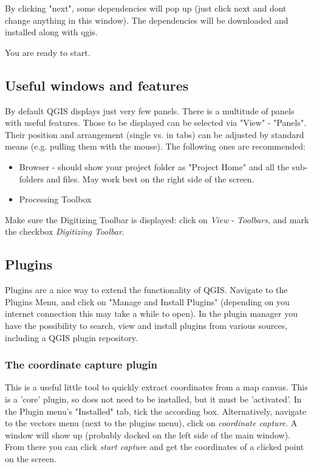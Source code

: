 \documentclass[12pt,a4paper]{scrartcl}
\begin{document}
By clicking "next", some dependencies will pop up (just click next and dont change anything in this window).
The dependencies will be downloaded and installed along with qgis.\newline

You are ready to start.

\subsection{Useful windows and features}
\label{subsec:qgis_adjust}
By default QGIS displays just very few panels. There is a multitude of panels with useful features. Those to be displayed can be selected via "View" - "Panels". Their position and arrangement (single vs. in tabs) can be adjusted by standard means (e.g. pulling them with the mouse). The following ones are recommended:
\begin{itemize}
	\item Browser - should show your project folder as "Project Home"  and all the sub-folders and files. May work best on the right side of the screen.
	\item Processing Toolbox
\end{itemize}

Make sure the Digitizing Toolbar is displayed: click on \textit{View} - \textit{Toolbars}, and mark the checkbox \textit{Digitizing Toolbar}.

\subsection{Plugins}
Plugins are a nice way to extend the functionality of QGIS. Navigate to the Plugins Menu, and click on "Manage and Install Plugins" (depending on you internet connection this may take a while to open). In the plugin manager you have the possibility to search, view and install plugins from various sources, including a QGIS plugin repository. 

\subsubsection{The coordinate capture plugin}
\label{coordcap}
This is a useful little tool to quickly extract coordinates from a map canvas. This is a 'core' plugin, so does not need to be installed, but it must be 'activated'. In the Plugin menu's "Installed" tab, tick the according box. Alternatively, navigate to the vectors menu (next to the plugins menu), click on \textit{coordinate capture}. A window will show up (probably docked on the left side of the main window). From there you can click \textit{start capture} and get the coordinates of a clicked point on the screen.
\end{document}
